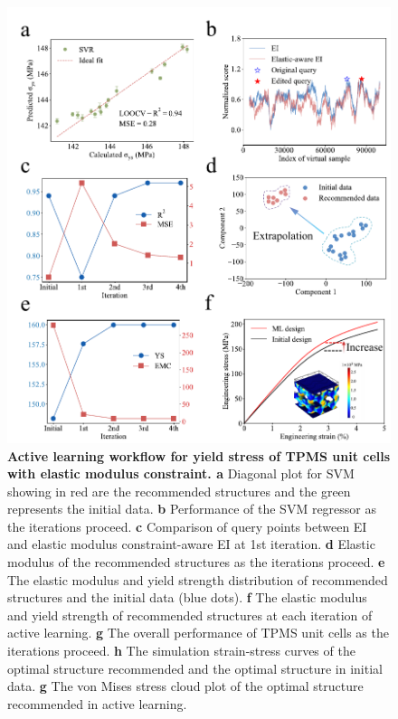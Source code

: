 \documentclass[preprint,review,12pt,authoryear]{elsarticle}
\begin{document}
\begin{figure}
    \centering
    \includegraphics[width=1\linewidth]{figures/7.pdf}
    \caption{\textbf{Active learning workflow for yield stress of TPMS unit cells with elastic modulus constraint. a} Diagonal plot for SVM showing in red are the recommended structures and the green represents the initial data. \textbf{b} Performance of the SVM regressor as the iterations proceed. \textbf{c} Comparison of query points between EI and elastic modulus constraint-aware EI at 1st iteration. \textbf{d} Elastic modulus of the recommended structures as the iterations proceed. \textbf{e} The elastic modulus and yield strength distribution of recommended structures and the initial data (blue dots). \textbf{f} The elastic modulus and yield strength of recommended structures at each iteration of active learning. \textbf{g} The overall performance of TPMS unit cells as the iterations proceed. \textbf{h} The simulation strain-stress curves of the optimal structure recommended and the optimal 
structure in initial data. \textbf{g} The von Mises stress cloud plot of the optimal structure recommended in active learning.}
    \label{fig:7}
\end{figure}
\end{document}
